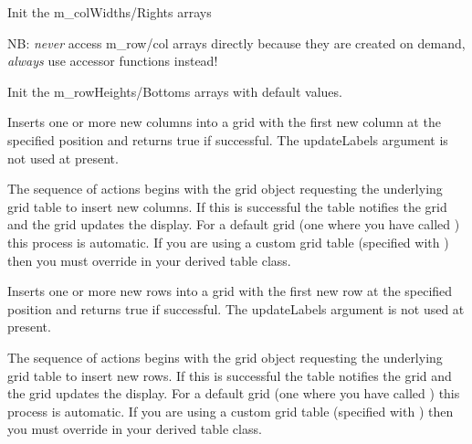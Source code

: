 Init the m\_colWidths/Rights arrays



\label{wxgridinitrowheights}


NB: {\it never} access m\_row/col arrays directly because they are created
on demand, {\it always} use accessor functions instead!

Init the m\_rowHeights/Bottoms arrays with default values.



\label{wxgridinsertcols}


Inserts one or more new columns into a grid with the first new column at the
specified position and returns true if successful. The updateLabels argument is not
used at present.

The sequence of actions begins with the grid object requesting the underlying grid
table to insert new columns. If this is successful the table notifies the grid and the
grid updates the display. For a default grid (one where you have called
) this process is automatic. If you are
using a custom grid table (specified with )
then you must override
 in your derived
table class.



\label{wxgridinsertrows}


Inserts one or more new rows into a grid with the first new row at the specified
position and returns true if successful. The updateLabels argument is not used at
present.

The sequence of actions begins with the grid object requesting the underlying grid
table to insert new rows. If this is successful the table notifies the grid and the
grid updates the display. For a default grid (one where you have called
) this process is automatic. If you are
using a custom grid table (specified with )
then you must override
 in your derived
table class.



